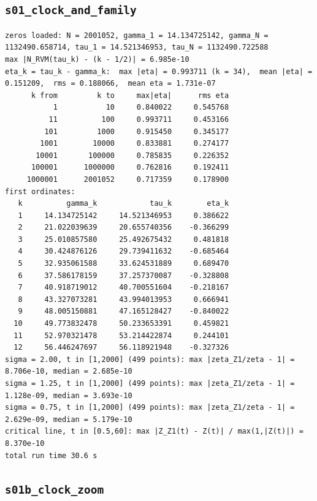 \documentclass[11pt,reqno]{amsart}
\numberwithin{equation}{section}
\theoremstyle{plain}
\theoremstyle{definition}
\theoremstyle{remark}
\begin{document}
\subsection{\texttt{s01\_clock\_and\_family}}
\label{app:out-s01-clock-and-family}

\begin{lstlisting}[style=out]
zeros loaded: N = 2001052, gamma_1 = 14.134725142, gamma_N = 1132490.658714, tau_1 = 14.521346953, tau_N = 1132490.722588
max |N_RVM(tau_k) - (k - 1/2)| = 6.985e-10
eta_k = tau_k - gamma_k:  max |eta| = 0.993711 (k = 34),  mean |eta| = 0.151209,  rms = 0.188066,  mean eta = 1.731e-07
      k from         k to     max|eta|      rms eta
           1           10     0.840022     0.545768
          11          100     0.993711     0.453166
         101         1000     0.915450     0.345177
        1001        10000     0.833881     0.274177
       10001       100000     0.785835     0.226352
      100001      1000000     0.762816     0.192411
     1000001      2001052     0.717359     0.178900
first ordinates:
   k          gamma_k            tau_k        eta_k
   1     14.134725142     14.521346953     0.386622
   2     21.022039639     20.655740356    -0.366299
   3     25.010857580     25.492675432     0.481818
   4     30.424876126     29.739411632    -0.685464
   5     32.935061588     33.624531889     0.689470
   6     37.586178159     37.257370087    -0.328808
   7     40.918719012     40.700551604    -0.218167
   8     43.327073281     43.994013953     0.666941
   9     48.005150881     47.165128427    -0.840022
  10     49.773832478     50.233653391     0.459821
  11     52.970321478     53.214422874     0.244101
  12     56.446247697     56.118921948    -0.327326
sigma = 2.00, t in [1,2000] (499 points): max |zeta_Z1/zeta - 1| = 8.706e-10, median = 2.685e-10
sigma = 1.25, t in [1,2000] (499 points): max |zeta_Z1/zeta - 1| = 1.128e-09, median = 3.693e-10
sigma = 0.75, t in [1,2000] (499 points): max |zeta_Z1/zeta - 1| = 2.629e-09, median = 5.179e-10
critical line, t in [0.5,60]: max |Z_Z1(t) - Z(t)| / max(1,|Z(t)|) = 8.370e-10
total run time 30.6 s
\end{lstlisting}

\subsection{\texttt{s01b\_clock\_zoom}}
\label{app:out-s01b-clock-zoom}
\end{document}
